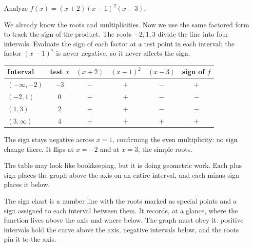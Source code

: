 \documentclass[12pt]{book}
\begin{document}
\begin{example}
Analyze $f(x)=(x+2)(x-1)^2(x-3)$.

We already know the roots and multiplicities. Now we use the same factored form to
track the sign of the product. The roots $-2,1,3$ divide the line into four
intervals. Evaluate the sign of each factor at a test point in each interval; the
factor $(x-1)^2$ is never negative, so it never affects the sign.
\begin{center}
\renewcommand{\arraystretch}{1.3}
\begin{tabular}{@{}lccccc@{}}
\toprule
Interval & test $x$ & $(x+2)$ & $(x-1)^2$ & $(x-3)$ & sign of $f$\\
\midrule
$(-\infty,-2)$ & $-3$ & $-$ & $+$ & $-$ & $+$\\
$(-2,1)$       & $0$  & $+$ & $+$ & $-$ & $-$\\
$(1,3)$        & $2$  & $+$ & $+$ & $-$ & $-$\\
$(3,\infty)$   & $4$  & $+$ & $+$ & $+$ & $+$\\
\bottomrule
\end{tabular}
\end{center}
The sign stays negative across $x=1$, confirming the even multiplicity: no sign
change there. It flips at $x=-2$ and at $x=3$, the simple roots.
\end{example}

The table may look like bookkeeping, but it is doing geometric work. Each plus sign
places the graph above the axis on an entire interval, and each minus sign places it
below.

\begin{center}
\end{center}

\begin{visual}
The sign chart is a number line with the roots marked as special points and a sign
assigned to each interval between them. It records, at a glance, where the function
lives above the axis and where below. The graph must obey it: positive intervals
hold the curve above the axis, negative intervals below, and the roots pin it to the
axis.
\end{visual}
\end{document}
